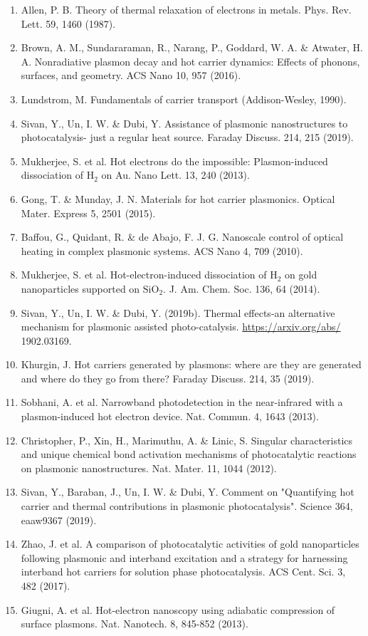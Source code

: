 \documentclass[10pt]{article}
\begin{document}
\begin{enumerate}
  \item Allen, P. B. Theory of thermal relaxation of electrons in metals. Phys. Rev. Lett. 59, 1460 (1987).
  \item Brown, A. M., Sundararaman, R., Narang, P., Goddard, W. A. \& Atwater, H. A. Nonradiative plasmon decay and hot carrier dynamics: Effects of phonons, surfaces, and geometry. ACS Nano 10, 957 (2016).
  \item Lundstrom, M. Fundamentals of carrier transport (Addison-Wesley, 1990).
  \item Sivan, Y., Un, I. W. \& Dubi, Y. Assistance of plasmonic nanostructures to photocatalysis- just a regular heat source. Faraday Discuss. 214, 215 (2019).
  \item Mukherjee, S. et al. Hot electrons do the impossible: Plasmon-induced dissociation of $\mathrm{H}_{2}$ on Au. Nano Lett. 13, 240 (2013).
  \item Gong, T. \& Munday, J. N. Materials for hot carrier plasmonics. Optical Mater. Express 5, 2501 (2015).
  \item Baffou, G., Quidant, R. \& de Abajo, F. J. G. Nanoscale control of optical heating in complex plasmonic systems. ACS Nano 4, 709 (2010).
  \item Mukherjee, S. et al. Hot-electron-induced dissociation of $\mathrm{H}_{2}$ on gold nanoparticles supported on $\mathrm{SiO}_{2}$. J. Am. Chem. Soc. 136, 64 (2014).
  \item Sivan, Y., Un, I. W. \& Dubi, Y. (2019b). Thermal effects-an alternative mechanism for plasmonic assisted photo-catalysis. \href{https://arxiv.org/abs/}{https://arxiv.org/abs/} 1902.03169.
  \item Khurgin, J. Hot carriers generated by plasmons: where are they are generated and where do they go from there? Faraday Discuss. 214, 35 (2019).
  \item Sobhani, A. et al. Narrowband photodetection in the near-infrared with a plasmon-induced hot electron device. Nat. Commun. 4, 1643 (2013).
  \item Christopher, P., Xin, H., Marimuthu, A. \& Linic, S. Singular characteristics and unique chemical bond activation mechanisms of photocatalytic reactions on plasmonic nanostructures. Nat. Mater. 11, 1044 (2012).
  \item Sivan, Y., Baraban, J., Un, I. W. \& Dubi, Y. Comment on "Quantifying hot carrier and thermal contributions in plasmonic photocatalysis". Science 364, eaaw9367 (2019).
  \item Zhao, J. et al. A comparison of photocatalytic activities of gold nanoparticles following plasmonic and interband excitation and a strategy for harnessing interband hot carriers for solution phase photocatalysis. ACS Cent. Sci. 3, 482 (2017).
  \item Giugni, A. et al. Hot-electron nanoscopy using adiabatic compression of surface plasmons. Nat. Nanotech. 8, 845-852 (2013).
\end{enumerate}
\end{document}
